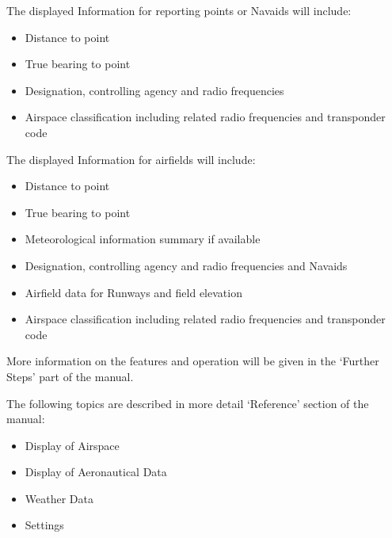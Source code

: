 \documentclass[letterpaper,10pt,english]{sphinxmanual}
\begin{document}
\sphinxAtStartPar
The displayed Information for reporting points or Navaids will include:
\begin{itemize}
\item {} 
\sphinxAtStartPar
Distance to point

\item {} 
\sphinxAtStartPar
True bearing to point

\item {} 
\sphinxAtStartPar
Designation, controlling agency and radio frequencies

\item {} 
\sphinxAtStartPar
Airspace classification including related radio frequencies and transponder code

\end{itemize}

\sphinxAtStartPar
The displayed Information for airfields will include:
\begin{itemize}
\item {} 
\sphinxAtStartPar
Distance to point

\item {} 
\sphinxAtStartPar
True bearing to point

\item {} 
\sphinxAtStartPar
Meteorological information summary if available

\item {} 
\sphinxAtStartPar
Designation, controlling agency and radio frequencies and Navaids

\item {} 
\sphinxAtStartPar
Airfield data for Runways and field elevation

\item {} 
\sphinxAtStartPar
Airspace classification including related radio frequencies and transponder code

\end{itemize}

\sphinxAtStartPar
More information on the features and operation will be given in the ‘Further
Steps’ part of the  manual.

\sphinxAtStartPar
The following topics are described in more detail 
‘Reference’ section of the manual:
\begin{itemize}
\item {} 
\sphinxAtStartPar
Display of Airspace

\item {} 
\sphinxAtStartPar
Display of Aeronautical Data

\item {} 
\sphinxAtStartPar
Weather Data

\item {} 
\sphinxAtStartPar
Settings

\end{itemize}
\end{document}
